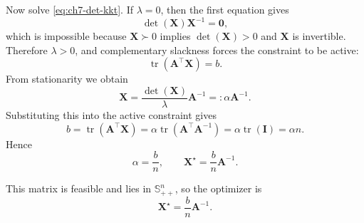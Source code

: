 \begin{example}
Now solve \eqref{eq:ch7-det-kkt}. If $\lambda=0$, then the first equation gives
\[
  \det(\mathbf{X})\mathbf{X}^{-1}=\mathbf{0},
\]
which is impossible because $\mathbf{X}\succ 0$ implies
$\det(\mathbf{X})>0$ and $\mathbf{X}$ is invertible. Therefore $\lambda>0$, and
complementary slackness forces the constraint to be active:
\[
  \operatorname{tr}(\mathbf{A}^\top \mathbf{X})=b.
\]
From stationarity we obtain
\[
  \mathbf{X}
  =
  \frac{\det(\mathbf{X})}{\lambda}\mathbf{A}^{-1}
  =:\alpha \mathbf{A}^{-1}.
\]
Substituting this into the active constraint gives
\[
  b
  =
  \operatorname{tr}(\mathbf{A}^\top \mathbf{X})
  =
  \alpha \operatorname{tr}(\mathbf{A}^\top \mathbf{A}^{-1})
  =
  \alpha \operatorname{tr}(\mathbf{I})
  =
  \alpha n.
\]
Hence
\[
  \alpha = \frac{b}{n},
  \qquad
  \mathbf{X}^\star = \frac{b}{n}\mathbf{A}^{-1}.
\]

This matrix is feasible and lies in $\mathbb{S}_{++}^n$, so the optimizer is
\[
  \boxed{
    \mathbf{X}^\star = \frac{b}{n}\mathbf{A}^{-1}
  }.
\]
\end{example}

